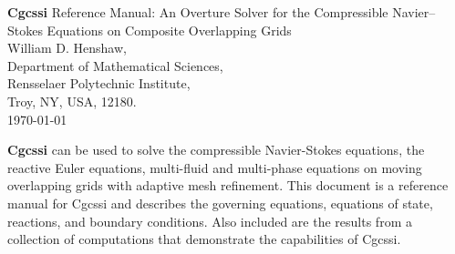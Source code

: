 \documentclass{article}
\begin{document}


\def\comma  {~~~,~~}
\newcommand{\uvd}{\mathbf{U}}
\def\ud     {{    U}}
\def\pd     {{    P}}
\def\calo{{\cal O}}

\newcommand{\mbar}{\bar{m}}
\newcommand{\Rbar}{\bar{R}}
\newcommand{\Ru}{R_u}         %
\newcommand{\Div}{\grad\cdot}
\newcommand{\tauv}{\boldsymbol{\tau}}
\newcommand{\thetav}{\boldsymbol{\theta}}

\newcommand{\Omegav}{\boldsymbol{\Omega}}
\newcommand{\omegav}{\boldsymbol{\omega}}
\newcommand{\cm}{{\rm cm}}

\newcommand{\sumi}{\sum_{i=1}^n}
\newcommand{\dt}{{\Delta t}}

\def\ff {\tt} %
\newcommand{\Ic}{{\mathcal I}}
\newcommand{\Rc}{{\mathcal R}}
\newcommand{\Gc}{{\mathcal G}}


\vspace{5\baselineskip}
\begin{flushleft}
{\Large
{\bf Cgcssi} Reference Manual: An Overture Solver for the Compressible Navier--Stokes Equations 
  on Composite Overlapping Grids \\
}
\vspace{2\baselineskip}
William D. Henshaw,\\
Department of Mathematical Sciences, \\
Rensselaer Polytechnic Institute, \\
Troy, NY, USA, 12180. \\
\vspace{\baselineskip}
\today\\
\vspace{\baselineskip}

\vspace{4\baselineskip}


{\bf Cgcssi} can be used 
to solve the compressible Navier-Stokes equations, the reactive Euler equations,
multi-fluid and multi-phase equations on moving overlapping grids with
adaptive mesh refinement.
This document is a reference manual for Cgcssi and
describes the governing equations, equations of state, reactions,
and boundary conditions. Also included are the results from a 
collection of computations that demonstrate the capabilities of Cgcssi.



\end{flushleft}
\end{document}
